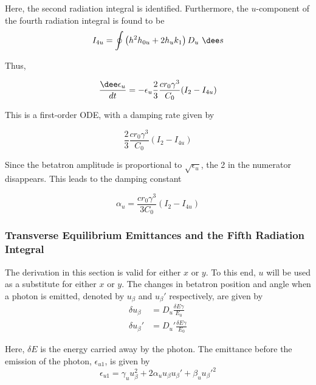 Here, the second radiation integral is identified. Furthermore, the $u$-component of the fourth radiation integral is found to be
\begin{equation}
    I_{4u} = \oint \left( h^2 h_{0u} + 2 h_u k_1 \right) D_u\ \dee s
\end{equation}

Thus,

\begin{equation}
    \frac{\dee \epsilon_u}{dt} = - \epsilon_u \frac{2}{3} \frac{c r_0 \gamma^3}{C_0} (I_2 - I_{4u})
\end{equation}

This is a first-order ODE, with a damping rate given by

\begin{equation}
    \frac{2}{3} \frac{c r_0 \gamma^3}{C_0} (I_2 - I_{4u})
\end{equation}

Since the betatron amplitude is proportional to $\sqrt{\epsilon_u}$, the 2 in the numerator disappears. This leads to the damping constant

\begin{equation}
    \alpha_u = \frac{c r_0 \gamma^3}{3C_0} (I_2 - I_{4u})
\end{equation}

\subsubsection{Transverse Equilibrium Emittances and the Fifth Radiation Integral}
\label{sec:transverseeqemiti5}

The derivation in this section is valid for either $x$ or $y$. To this end, $u$ will be used as a substitute for either $x$ or $y$. The changes in betatron position and angle when a photon is emitted, denoted by $u_\beta$ and $u_\beta'$ respectively, are given by
\begin{align}
    \delta u_\beta  &= D_u  \frac{\delta E\gamma}{E_0}
    \label{eq:deltaubeta}\\
    \delta u_\beta' &= D_u' \frac{\delta E\gamma}{E_0}
    \label{eq:deltaubetaprime}
\end{align}

Here, $\delta E$ is the energy carried away by the photon. The emittance before the emission of the photon, $\epsilon_{u1}$, is given by
\begin{equation}
    \epsilon_{u1} = \gamma_u u_\beta^2 + 2 \alpha_u u_\beta u_\beta' + \beta_u u_\beta'^2
\end{equation}

